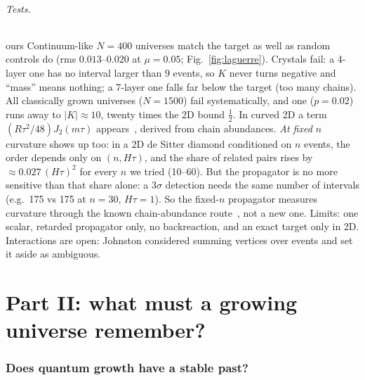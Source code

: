 \documentclass[11pt,a4paper]{article}
\newcommand{\tagbox}[2]{\textsf{\scriptsize\colorbox{#1!12}{\textcolor{#1!70!black}{#2}}}}
\newcommand{\ours}{\tagbox{orange}{ours}}
\begin{document}
\paragraph{Tests.} \ours{} Continuum-like $N=400$ universes match the target as well as random controls do (rms $0.013$--$0.020$ at $\mu=0.05$; Fig.~\ref{fig:laguerre}). Crystals fail: a 4-layer one has no interval larger than 9 events, so $K$ never turns negative and ``mass'' means nothing; a 7-layer one falls far below the target (too many chains). All classically grown universes ($N=1500$) fail systematically, and one ($p=0.02$) runs away to $|K|\approx10$, twenty times the 2D bound $\tfrac12$. In curved 2D a term $(R\tau^2/48)J_2(m\tau)$ appears~\cite{NXDS17}, derived from chain abundances. \emph{At fixed $n$} curvature shows up too: in a 2D de Sitter diamond conditioned on $n$ events, the order depends only on $(n,H\tau)$, and the share of related pairs rises by $\approx0.027\,(H\tau)^2$ for every $n$ we tried (10--60). But the propagator is no more sensitive than that share alone: a $3\sigma$ detection needs the same number of intervals (e.g.\ 175 vs 175 at $n=30$, $H\tau=1$). So the fixed-$n$ propagator measures curvature through the known chain-abundance route~\cite{RSS13}, not a new one. Limits: one scalar, retarded propagator only, no backreaction, and an exact target only in 2D. Interactions are open: Johnston considered summing vertices over events and set it aside as ambiguous.

\part*{Part II: what must a growing universe remember?}
\section{Does quantum growth have a stable past?}\label{sec:growth}
\end{document}
